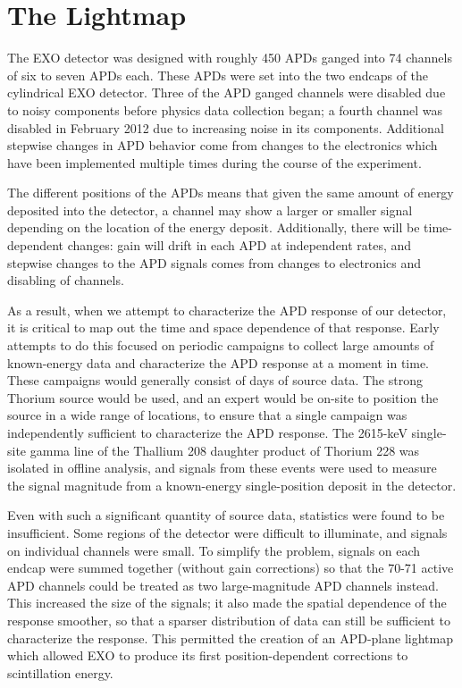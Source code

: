 
\renewcommand{\thechapter}{3}
\chapter{The Lightmap}

The EXO detector was designed with roughly 450 APDs ganged into 74 channels of six to seven APDs each.  These APDs were set into the two endcaps of the cylindrical EXO detector.  Three of the APD ganged channels were disabled due to noisy components before physics data collection began; a fourth channel was disabled in February 2012 due to increasing noise in its components.  Additional stepwise changes in APD behavior come from changes to the electronics which have been implemented multiple times during the course of the experiment.

The different positions of the APDs means that given the same amount of energy deposited into the detector, a channel may show a larger or smaller signal depending on the location of the energy deposit.  Additionally, there will be time-dependent changes: gain will drift in each APD at independent rates, and stepwise changes to the APD signals comes from changes to electronics and disabling of channels.

As a result, when we attempt to characterize the APD response of our detector, it is critical to map out the time and space dependence of that response.  Early attempts to do this focused on periodic campaigns to collect large amounts of known-energy data and characterize the APD response at a moment in time.  These campaigns would generally consist of days of source data.  The strong Thorium source would be used, and an expert would be on-site to position the source in a wide range of locations, to ensure that a single campaign was independently sufficient to characterize the APD response.  The 2615-keV single-site gamma line of the Thallium 208 daughter product of Thorium 228 was isolated in offline analysis, and signals from these events were used to measure the signal magnitude from a known-energy single-position deposit in the detector.

Even with such a significant quantity of source data, statistics were found to be insufficient.  Some regions of the detector were difficult to illuminate, and signals on individual channels were small.  To simplify the problem, signals on each endcap were summed together (without gain corrections) so that the 70-71 active APD channels could be treated as two large-magnitude APD channels instead.  This increased the size of the signals; it also made the spatial dependence of the response smoother, so that a sparser distribution of data can still be sufficient to characterize the response.  This permitted the creation of an APD-plane lightmap which allowed EXO to produce its first position-dependent corrections to scintillation energy.


